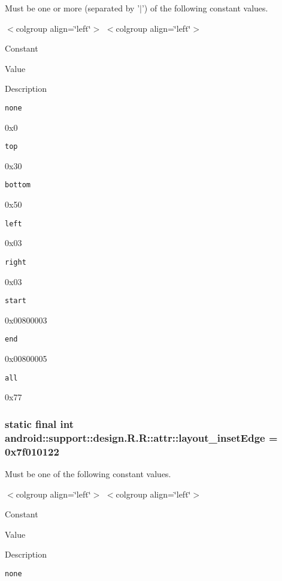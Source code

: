 Must be one or more (separated by '$|$') of the following constant values. \begin{TabularC}{0}
\hline
\end{TabularC}
$<$colgroup align=\char`\"{}left\char`\"{}$>$ $<$colgroup align=\char`\"{}left\char`\"{}$>$ 

Constant

Value

Description 

{\tt none}

0x0

{\tt top}

0x30

{\tt bottom}

0x50

{\tt left}

0x03

{\tt right}

0x03

{\tt start}

0x00800003

{\tt end}

0x00800005

{\tt all}

0x77\hypertarget{classandroid_1_1support_1_1design_1_1_r_1_1attr_ac11dcfe76874f766de4144aa37bd0d4}{
\subsubsection[{layout\_\-insetEdge}]{\setlength{\rightskip}{0pt plus 5cm}static final int android::support::design.R.R::attr::layout\_\-insetEdge = 0x7f010122}}
\label{classandroid_1_1support_1_1design_1_1_r_1_1attr_ac11dcfe76874f766de4144aa37bd0d4}


Must be one of the following constant values. \begin{TabularC}{0}
\hline
\end{TabularC}
$<$colgroup align=\char`\"{}left\char`\"{}$>$ $<$colgroup align=\char`\"{}left\char`\"{}$>$ 

Constant

Value

Description 

{\tt none}

